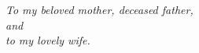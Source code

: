 \newpage
\thispagestyle{empty} \vspace*{2.5in}
\begin{center}
\emph{To my beloved mother, deceased father,\\
and \\ to my lovely wife.}
\end{center}
